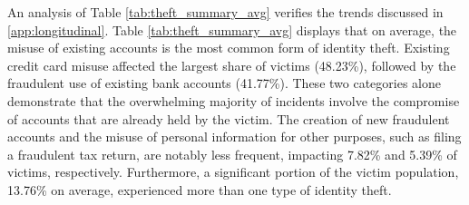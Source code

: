 \begin{table}[h!]
\begin{tabular}{lrr}
    \bottomrule
  \end{tabular}
\end{table}
An analysis of Table \ref{tab:theft_summary_avg} verifies the trends discussed in \ref{app:longitudinal}. Table \ref{tab:theft_summary_avg} displays that on average, the misuse of existing accounts is the most common form of identity theft. Existing credit card misuse affected the largest share of victims (48.23\%), followed by the fraudulent use of existing bank accounts (41.77\%). These two categories alone demonstrate that the overwhelming majority of incidents involve the compromise of accounts that are already held by the victim. The creation of new fraudulent accounts and the misuse of personal information for other purposes, such as filing a fraudulent tax return, are notably less frequent, impacting 7.82\% and 5.39\% of victims, respectively. Furthermore, a significant portion of the victim population, 13.76\% on average, experienced more than one type of identity theft.

